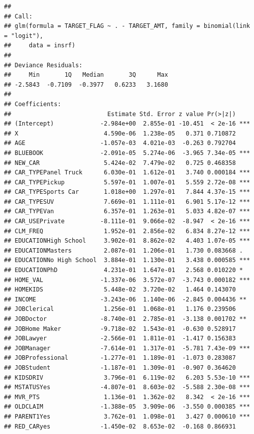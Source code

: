 \documentclass[]{article}
\begin{document}
\begin{verbatim}
## 
## Call:
## glm(formula = TARGET_FLAG ~ . - TARGET_AMT, family = binomial(link = "logit"), 
##     data = insrf)
## 
## Deviance Residuals: 
##     Min       1Q   Median       3Q      Max  
## -2.5843  -0.7109  -0.3977   0.6233   3.1680  
## 
## Coefficients:
##                           Estimate Std. Error z value Pr(>|z|)    
## (Intercept)             -2.984e+00  2.855e-01 -10.451  < 2e-16 ***
## X                        4.590e-06  1.238e-05   0.371 0.710872    
## AGE                     -1.057e-03  4.021e-03  -0.263 0.792704    
## BLUEBOOK                -2.091e-05  5.274e-06  -3.965 7.34e-05 ***
## NEW_CAR                  5.424e-02  7.479e-02   0.725 0.468358    
## CAR_TYPEPanel Truck      6.030e-01  1.612e-01   3.740 0.000184 ***
## CAR_TYPEPickup           5.597e-01  1.007e-01   5.559 2.72e-08 ***
## CAR_TYPESports Car       1.018e+00  1.297e-01   7.844 4.37e-15 ***
## CAR_TYPESUV              7.669e-01  1.111e-01   6.901 5.17e-12 ***
## CAR_TYPEVan              6.357e-01  1.263e-01   5.033 4.82e-07 ***
## CAR_USEPrivate          -8.111e-01  9.066e-02  -8.947  < 2e-16 ***
## CLM_FREQ                 1.952e-01  2.856e-02   6.834 8.27e-12 ***
## EDUCATIONHigh School     3.902e-01  8.862e-02   4.403 1.07e-05 ***
## EDUCATIONMasters         2.087e-01  1.206e-01   1.730 0.083668 .  
## EDUCATIONNo High School  3.884e-01  1.130e-01   3.438 0.000585 ***
## EDUCATIONPhD             4.231e-01  1.647e-01   2.568 0.010220 *  
## HOME_VAL                -1.337e-06  3.572e-07  -3.743 0.000182 ***
## HOMEKIDS                 5.448e-02  3.720e-02   1.464 0.143070    
## INCOME                  -3.243e-06  1.140e-06  -2.845 0.004436 ** 
## JOBClerical              1.256e-01  1.068e-01   1.176 0.239506    
## JOBDoctor               -8.740e-01  2.785e-01  -3.138 0.001702 ** 
## JOBHome Maker           -9.718e-02  1.543e-01  -0.630 0.528917    
## JOBLawyer               -2.566e-01  1.811e-01  -1.417 0.156383    
## JOBManager              -7.614e-01  1.317e-01  -5.781 7.43e-09 ***
## JOBProfessional         -1.277e-01  1.189e-01  -1.073 0.283087    
## JOBStudent              -1.187e-01  1.309e-01  -0.907 0.364620    
## KIDSDRIV                 3.796e-01  6.119e-02   6.203 5.53e-10 ***
## MSTATUSYes              -4.807e-01  8.603e-02  -5.588 2.30e-08 ***
## MVR_PTS                  1.136e-01  1.362e-02   8.342  < 2e-16 ***
## OLDCLAIM                -1.388e-05  3.909e-06  -3.550 0.000385 ***
## PARENT1Yes               3.762e-01  1.098e-01   3.427 0.000610 ***
## RED_CARyes              -1.450e-02  8.653e-02  -0.168 0.866931    

\end{verbatim}
\end{document}
